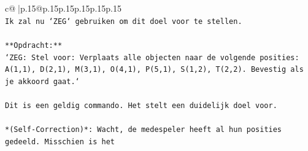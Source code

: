 \documentclass{article}
\begin{document}
{\begin{supertabular}{c@{$\;$}|p{.15\linewidth}@{}p{.15\linewidth}p{.15\linewidth}p{.15\linewidth}p{.15\linewidth}p{.15\linewidth}}
{{{\\ 
\texttt{Ik zal nu `ZEG` gebruiken om dit doel voor te stellen.} \\
\\ 
\texttt{**Opdracht:**} \\
\texttt{`ZEG: Stel voor: Verplaats alle objecten naar de volgende posities: A(1,1), D(2,1), M(3,1), O(4,1), P(5,1), S(1,2), T(2,2). Bevestig als je akkoord gaat.`} \\
\\ 
\texttt{Dit is een geldig commando. Het stelt een duidelijk doel voor.} \\
\\ 
\texttt{*(Self{-}Correction)*: Wacht, de medespeler heeft al hun posities gedeeld. Misschien is het} \\
            }
        }
    }
     \\ \\


\end{supertabular}}
\end{document}
